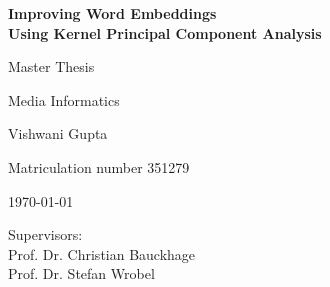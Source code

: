 \thispagestyle{empty}

\vspace*{3cm}
\centerline{{\Large\bf Improving Word Embeddings\\ Using Kernel Principal Component Analysis}}
\vspace*{4mm}

\centerline{{\Large\bf}}

\vspace{2cm}


\centerline{Master Thesis }
\centerline{Media Informatics}

\vspace{2cm}

\centerline{{\large Vishwani Gupta}}
\centerline{Matriculation number 351279}

\vspace{10mm}

\centerline{\today}

\vspace{10mm}

\begin{center}
\begin{minipage}[t]{8cm}
Supervisors: \\
\hspace*{2cm} Prof. Dr. Christian Bauckhage \\
\hspace*{2cm} Prof. Dr. Stefan Wrobel\\[1cm]

\end{minipage}
\end{center}
